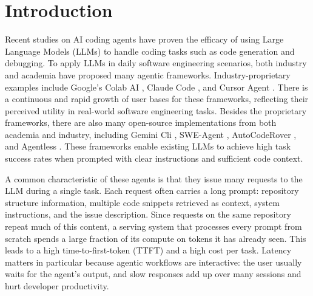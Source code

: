 \chapter{Introduction}


Recent studies on AI coding agents have proven the efficacy of using Large Language Models (LLMs) to handle coding tasks such as code generation and debugging. To apply LLMs in daily software engineering scenarios, both industry and academia have proposed many agentic frameworks. Industry-proprietary examples include Google's Colab AI \cite{google_2025_colab_ai_first}, Claude Code \cite{anthropic_2025_claude_code_ga}, and Cursor Agent \cite{cursor_2025_agent_cli}. There is a continuous and rapid growth of user bases for these frameworks, reflecting their perceived utility in real-world software engineering tasks. Besides the proprietary frameworks, there are also many open-source implementations from both academia and industry, including Gemini Cli \cite{mullen_salva_2025_gemini_cli}, SWE-Agent \cite{yang2024sweagent}, AutoCodeRover \cite{zhang2024autocoderover}, and Agentless \cite{xia2024agentlessdemystifyingllmbasedsoftware}. These frameworks enable existing LLMs to achieve high task success rates when prompted with clear instructions and sufficient code context.

A common characteristic of these agents is that they issue many requests to the LLM during a single task. Each request often carries a long prompt: repository structure information, multiple code snippets retrieved as context, system instructions, and the issue description. Since requests on the same repository repeat much of this content, a serving system that processes every prompt from scratch spends a large fraction of its compute on tokens it has already seen. This leads to a high time-to-first-token (TTFT) and a high cost per task. Latency matters in particular because agentic workflows are interactive: the user usually waits for the agent's output, and slow responses add up over many sessions and hurt developer productivity.

